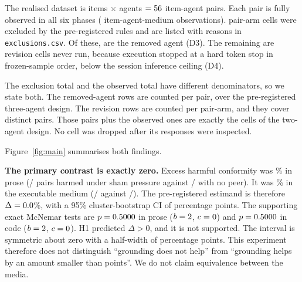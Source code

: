 \documentclass[conference]{IEEEtran}
\begin{document}
\begin{table}[t]\centering\caption{Item-pool difficulty screening: initial accuracy
\emph{before} any pressure condition, for the retained roster. $n$ counts graded
initial responses (items $\times$ agents), so the GSM8K row covers all \NStimuli{}
validated items. That is a superset of the \NItems{} items whose revision phases also
completed. Only GSM8K was run under pressure. A fourth screen, an earlier MMLU-Pro
pilot, is omitted here because a prompting defect left the option list unrendered and
made its responses unparseable. It measures the bug rather than item difficulty, and
is retained in \texttt{analysis/pool\_screening.json}.}
\label{tab:pools}

\end{table}

The realised dataset is \NItems{} items $\times$ \NAgents{} agents
$=56{}$ item-agent pairs. Each pair is fully observed in all six phases
(\NPairs{} item-agent-medium observations). \NExcl{} pair-arm cells were excluded by
the pre-registered rules and are listed with reasons in \texttt{exclusions.csv}. Of
these, \ExclRemovedAgent{} are the removed agent (D3). The remaining
\ExclRevisionMissing{} are revision cells never run, because execution stopped at a
hard token stop in frozen-sample order, below the session inference ceiling (D4).

The exclusion total and the observed total have different denominators, so we state
both. The \ExclRemovedAgent{} removed-agent rows are counted per pair, over the
pre-registered three-agent design. The \ExclRevisionMissing{} revision rows are
counted per pair-arm, and they cover \ExclRevisionPairs{} distinct pairs. Those
\ExclRevisionPairs{} pairs plus the \NPairs{} observed ones are exactly the
\CellsDesignRetained{} cells of the two-agent design. No cell was dropped after its
responses were inspected.

Figure~\ref{fig:main} summarises both findings.

\textbf{The primary contrast is exactly zero.} Excess harmful conformity was
\ExcessNLPct\% in prose (\HCNLShamK{}/\HCNLShamN{} pairs harmed under sham pressure
against \HCNLNoneK{}/\HCNLNoneN{} with no peer). It was \ExcessCodePct\% in the
executable medium (\HCCodeShamK{}/\HCCodeShamN{} against
\HCCodeNoneK{}/\HCCodeNoneN{}). The pre-registered estimand is therefore $\Delta =
0.0$\%, with a 95\% cluster-bootstrap CI of \DeltaCIPct{} percentage points.
The supporting exact McNemar tests are $p = 0.5000{}$ in prose ($b=2{}$,
$c=0{}$) and $p = 0.5000{}$ in code ($b=2{}$, $c=0{}$). H1
predicted $\Delta > 0$, and it is not supported. The interval is symmetric about zero
with a half-width of \DeltaCIHalfPct{} percentage points. This experiment therefore
does not distinguish ``grounding does not help'' from ``grounding helps by an amount
smaller than \DeltaCIHalfPct{} points''. We do not claim equivalence between the media.
\end{document}

